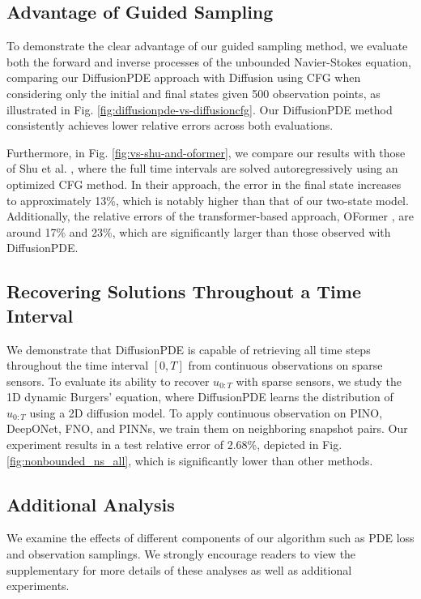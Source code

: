 \subsection{Advantage of Guided Sampling}

To demonstrate the clear advantage of our guided sampling method, we evaluate both the forward and inverse processes of the unbounded Navier-Stokes equation, comparing our DiffusionPDE approach with Diffusion using  CFG when considering only the initial and final states given 500 observation points, as illustrated in Fig. \ref{fig:diffusionpde-vs-diffusioncfg}. Our DiffusionPDE method consistently achieves lower relative errors across both evaluations.

Furthermore, in Fig. \ref{fig:vs-shu-and-oformer}, we compare our results with those of Shu et al. \cite{shu2023physics}, where the full time intervals are solved autoregressively using an optimized CFG method. In their approach, the error in the final state increases to approximately 13\%, which is notably higher than that of our two-state model. Additionally, the relative errors of the transformer-based approach, OFormer \cite{li2022transformer}, are around 17\% and 23\%, which are significantly larger than those observed with DiffusionPDE.


\subsection{Recovering Solutions Throughout a Time Interval}\label{sec:recover-all}

We demonstrate that DiffusionPDE is capable of retrieving all time steps throughout the time interval $[0,T]$ from continuous observations on sparse sensors. To evaluate its ability to recover $u_{0:T}$ with sparse sensors, we study the 1D dynamic Burgers' equation, where DiffusionPDE learns the distribution of $u_{0:T}$ using a 2D diffusion model. To apply continuous observation on PINO, DeepONet, FNO, and PINNs, we train them on neighboring snapshot pairs. Our experiment results in a test relative error of 2.68\%, depicted in Fig. \ref{fig:nonbounded_ns_all}, which is significantly lower than other methods. 


\subsection{Additional Analysis}\label{sec:ablation}
We examine the effects of different components of our algorithm such as PDE loss and observation samplings.
We strongly encourage readers to view the supplementary for more details of these analyses as well as additional experiments.
